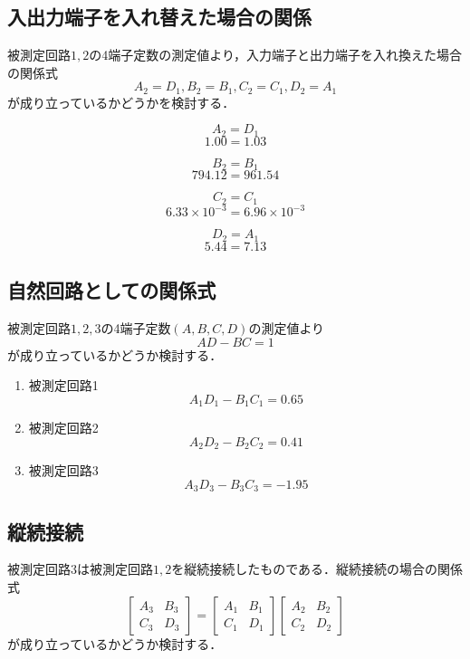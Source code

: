 \newpage



\subsection{入出力端子を入れ替えた場合の関係}
被測定回路$1,2$の4端子定数の測定値より，入力端子と出力端子を入れ換えた場合の関係式
$$
A_2=D_1, B_2=B_1, C_2=C_1, D_2=A_1
$$
が成り立っているかどうかを検討する．

$$A_2=D_1$$
$$1.00=1.03$$

$$B_2=B_1$$
$$794.12=961.54$$

$$C_2=C_1$$
$$6.33\times10^{-3}=6.96\times10^{-3}$$

$$D_2=A_1$$
$$5.44=7.13$$

\subsection{自然回路としての関係式}
被測定回路$1,2,3$の4端子定数$(A, B, C, D)$の測定値より
$$
A D-B C=1
$$
が成り立っているかどうか検討する． 

\begin{enumerate}
    \item 被測定回路1
    $$
    A_1D_1-B_1C_1=0.65
    $$
    
    \item 被測定回路2
    $$
    A_2D_2-B_2C_2=0.41
    $$
    
    \item 被測定回路3
    $$
    A_3D_3-B_3C_3=-1.95
    $$
    
\end{enumerate}

\subsection{縦続接続}
被測定回路3は被測定回路$1,2$を縦続接続したものである．縦続接続の場合の関係式
$$
\left[\begin{array}{ll}
A_3 & B_3 \\
C_3 & D_3
\end{array}\right]=\left[\begin{array}{ll}
A_1 & B_1 \\
C_1 & D_1
\end{array}\right]\left[\begin{array}{cc}
A_2 & B_2 \\
C_2 & D_2
\end{array}\right]
$$
が成り立っているかどうか検討する．

